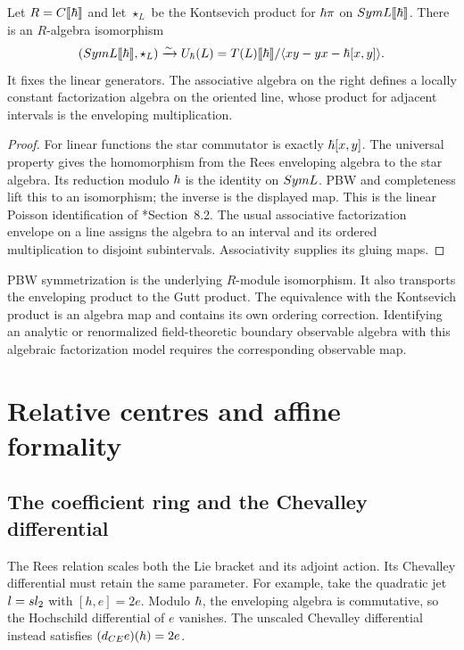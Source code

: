 \begin{theorem}
Let $R=C\llbracket\hbar\rrbracket$ and let $\star_L$ be the
Kontsevich product for $\hbar\pi$ on $Sym L\llbracket\hbar\rrbracket$.
There is an $R$-algebra isomorphism
\[
 (Sym L\llbracket\hbar\rrbracket,\star_L)
 \xrightarrow{\sim}
 U_\hbar(L)
 =T(L)\llbracket\hbar\rrbracket/
   \langle xy-yx-\hbar[x,y]\rangle.
\]
It fixes the linear generators.  The associative algebra on the right
defines a locally constant factorization algebra on the oriented line,
whose product for adjacent intervals is the enveloping multiplication.
\end{theorem}
\begin{proof}
For linear functions the star commutator is exactly
$\hbar[x,y]$.  The universal property gives the homomorphism from
the Rees enveloping algebra to the star algebra.
Its reduction modulo $\hbar$ is the identity on $Sym L$.
PBW and completeness lift this to an isomorphism; the inverse is the
displayed map.  This is the linear Poisson identification of
\cite{KontsevichDQ}*{Section~8.2}.
The usual associative factorization envelope on a line assigns the
algebra to an interval and its ordered multiplication to disjoint
subintervals.  Associativity supplies its gluing maps.
\end{proof}

PBW symmetrization is the underlying $R$-module isomorphism.
It also transports the enveloping product to the Gutt product.
The equivalence with the Kontsevich product is an algebra map and
contains its own ordering correction.  Identifying an analytic or
renormalized field-theoretic boundary observable algebra with this
algebraic factorization model requires the corresponding observable map.

\chapter{Relative centres and affine formality}
\section{The coefficient ring and the Chevalley differential}
The Rees relation scales both the Lie bracket and its adjoint action.
Its Chevalley differential must retain the same parameter.
For example, take the quadratic jet $l=sl_2$ with
$[h,e]=2e$.  Modulo $\hbar$, the enveloping algebra is commutative,
so the Hochschild differential of $e$ vanishes.
The unscaled Chevalley differential instead satisfies
$(d_{CE}e)(h)=2e$.

